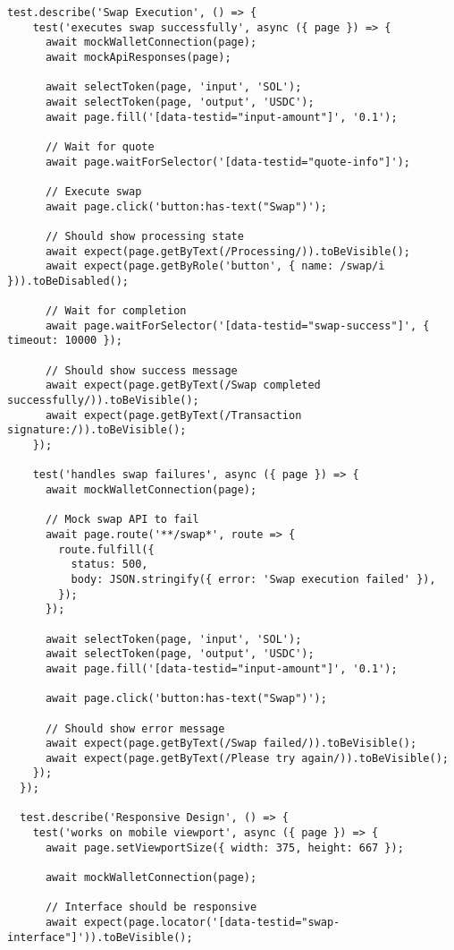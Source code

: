 \documentclass[11pt,a4paper]{article}
\begin{document}
\begin{lstlisting}[style=typescript, caption=E2E Test Implementation]
  test.describe('Swap Execution', () => {
    test('executes swap successfully', async ({ page }) => {
      await mockWalletConnection(page);
      await mockApiResponses(page);

      await selectToken(page, 'input', 'SOL');
      await selectToken(page, 'output', 'USDC');
      await page.fill('[data-testid="input-amount"]', '0.1');

      // Wait for quote
      await page.waitForSelector('[data-testid="quote-info"]');

      // Execute swap
      await page.click('button:has-text("Swap")');

      // Should show processing state
      await expect(page.getByText(/Processing/)).toBeVisible();
      await expect(page.getByRole('button', { name: /swap/i })).toBeDisabled();

      // Wait for completion
      await page.waitForSelector('[data-testid="swap-success"]', { timeout: 10000 });

      // Should show success message
      await expect(page.getByText(/Swap completed successfully/)).toBeVisible();
      await expect(page.getByText(/Transaction signature:/)).toBeVisible();
    });

    test('handles swap failures', async ({ page }) => {
      await mockWalletConnection(page);

      // Mock swap API to fail
      await page.route('**/swap*', route => {
        route.fulfill({
          status: 500,
          body: JSON.stringify({ error: 'Swap execution failed' }),
        });
      });

      await selectToken(page, 'input', 'SOL');
      await selectToken(page, 'output', 'USDC');
      await page.fill('[data-testid="input-amount"]', '0.1');

      await page.click('button:has-text("Swap")');

      // Should show error message
      await expect(page.getByText(/Swap failed/)).toBeVisible();
      await expect(page.getByText(/Please try again/)).toBeVisible();
    });
  });

  test.describe('Responsive Design', () => {
    test('works on mobile viewport', async ({ page }) => {
      await page.setViewportSize({ width: 375, height: 667 });
      
      await mockWalletConnection(page);

      // Interface should be responsive
      await expect(page.locator('[data-testid="swap-interface"]')).toBeVisible();
      

\end{lstlisting}
\end{document}
